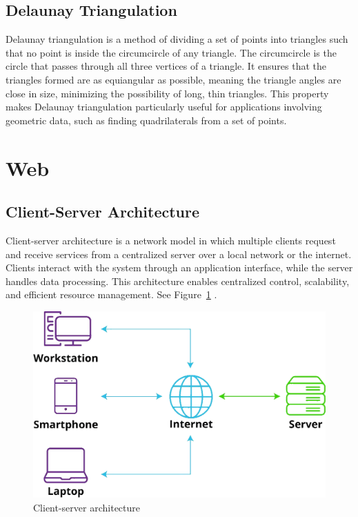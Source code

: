 \subsection*{Delaunay Triangulation}

Delaunay triangulation is a method of dividing a set of points into triangles such that no point is inside the circumcircle of any triangle. The circumcircle is the circle that passes through all three vertices of a triangle. It ensures that the triangles formed are as equiangular as possible,  meaning the triangle angles are close in size, minimizing the possibility of long, thin triangles. This property makes Delaunay triangulation particularly useful for applications involving geometric data, such as finding quadrilaterals from a set of points.

\section{Web}
\label{subsec:web}


\subsection*{Client-Server Architecture}
\label{subsubsec:client-server}

Client-server architecture is a network model in which multiple clients request and receive services from a centralized server over a local network or the internet. Clients interact with the system through an application interface, while the server handles data processing. This architecture enables centralized control, scalability, and efficient resource management. See Figure~\ref{fig:client-server-architecture} \cite{liquidweb:client-server}.


\begin{figure}[h!]
    \centering
    \includegraphics[width=0.75\linewidth]{figures/theory/client-server-architecture.png}
    \caption[Client-server architecture]{Client-server architecture \cite{liquidweb:client-server}}
    \label{fig:client-server-architecture}
\end{figure}

